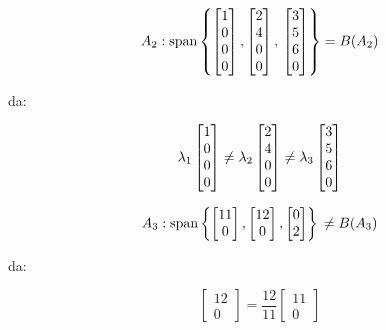 \documentclass[a4paper, 11pt]{article}
\begin{document}
$$A_2: \text{span}\left\{\begin{bmatrix} 1 \\ 0 \\ 0 \\ 0\end{bmatrix}, \begin{bmatrix} 2 \\ 4 \\ 0 \\ 0\end{bmatrix}, \\
\begin{bmatrix} 3 \\ 5 \\ 6 \\ 0\end{bmatrix}\right\} = B(A_2)$$


da:

$$\lambda_1\begin{bmatrix} 1 \\ 0 \\ 0 \\ 0\end{bmatrix} \neq \lambda_2\begin{bmatrix} 2 \\ 4 \\ 0 \\ 0\end{bmatrix} \neq \\
\lambda_3\begin{bmatrix} 3 \\ 5 \\ 6 \\ 0\end{bmatrix}$$

$$A_3: \text{span}\left\{\begin{bmatrix} 11 \\ 0\end{bmatrix}, \begin{bmatrix} 12 \\ 0\end{bmatrix}, \begin{bmatrix} 0 \\ 2\end{bmatrix}\right\} \\
\neq B(A_3)$$


da:

$$\begin{bmatrix} 12 \\ 0\end{bmatrix} = \frac{12}{11}\begin{bmatrix} 11 \\ 0\end{bmatrix}$$
\end{document}
